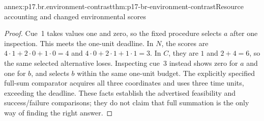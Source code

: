 \begin{annexitem}{annex:p17.br.environment-contrast}{thm:p17-br-environment-contrast}{Resource accounting and changed environmental scores}
\begin{proof}
Cue~1 takes values one and zero, so the fixed procedure selects \(a\)
after one inspection. This meets the one-unit deadline. In \(N\),
the scores are \(4\cdot1+2\cdot0+1\cdot0=4\) and
\(4\cdot0+2\cdot1+1\cdot1=3\). In \(C\), they are
\(1\) and \(2+4=6\), so the same selected alternative loses.
Inspecting cue~3 instead shows zero for \(a\) and one for \(b\),
and selects \(b\) within the same one-unit budget. The explicitly
specified full-sum comparator acquires all three coordinates and uses
three time units, exceeding the deadline. These facts establish the
advertised feasibility and success/failure comparisons; they do not
claim that full summation is the only way of finding the right answer.
\end{proof}
\end{annexitem}
